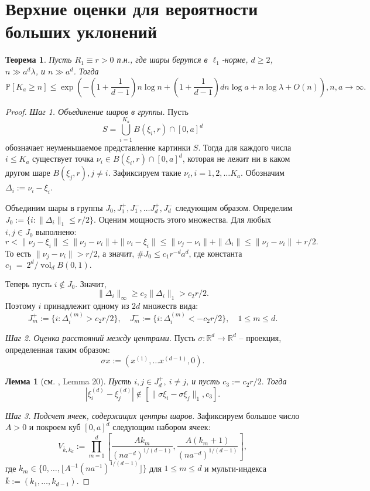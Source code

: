 \documentclass[12pt]{article}
\theoremstyle{plain}
\newtheorem{thm}{Теорема} %
\newtheorem{lm}{Лемма}
\theoremstyle{definition}
\theoremstyle{remark}
\def\geq{\geqslant}
\def\leq{\leqslant}
\DeclareMathOperator{\vol}{vol}
\newcommand{\R}{\mathbb{R}}
\newcommand{\PP}{\mathbb{P}}
\begin{document}
\section{Верхние оценки для вероятности больших уклонений}

\begin{thm}\label{uppconst1}
Пусть $R_1\equiv r > 0$ п.н., где шары берутся в $\ell_1$-норме, $d\geq 2$,  $n \gg a^d\lambda$, и $n\gg a^d$. 
Тогда $$\PP[K_a \geq n] \leq \exp \left(-\left(1+\dfrac{1}{d-1}\right)n\log n + \left(1 + \dfrac{1}{d-1}\right)dn\log a  + n\log\lambda + O(n)\right), n, a\to \infty.$$
\end{thm}{}



\begin{proof}
{\it Шаг 1. Объединение шаров в группы.} Пусть $$S = \bigcup_{i=1}^{K_a} B(\xi_i, r) \cap [0,a]^d$$ обозначает неуменьшаемое представление картинки $S$. Тогда для каждого числа $i\leq K_a$ существует точка $\nu_i\in B(\xi_i, r) \cap [0,a]^d$, которая не лежит ни в каком другом шаре $B(\xi_j, r), j \not= i$. Зафиксируем такие $\nu_i, i = 1, 2, \ldots K_a$. Обозначим $\Delta_i := \nu_i - \xi_i$.

Объединим шары в группы $J_0, J_1^+, J_1^-, \ldots J_d^+, J_d^-$ следующим образом. Определим $J_0 := \{i \colon \|\Delta_i\|_1 \leq r/2\}$. Оценим мощность этого множества. Для любых $i, j \in J_0$ выполнено:
$$r < \|\nu_j - \xi_i\| \leq \|\nu_j - \nu_i\| + \|\nu_i - \xi_i\| \leq 
\|\nu_j - \nu_i\| + \|\Delta_i\| \leq \|\nu_j - \nu_i\| + r/2.$$
То есть $\|\nu_j-\nu_i\|> r/2$, а значит, $\#J_0 \leq  c_1r^{-d}a^d$, где константа $c_1~=~2^d/\vol_d B(0,1).$

Теперь пусть $i\not\in J_0$. Значит, $$\|\Delta_i\|_\infty \geq c_2\|\Delta_i\|_1 > c_2r/2.$$ Поэтому $i$ принадлежит одному из $2d$ множеств вида: $$J_m^+ := \{i\colon \Delta_i^{(m)} > c_2r/2\}, \quad J_m^- := \{i\colon \Delta_i^{(m)} < - c_2r/2\}, \quad 1\leq m\leq d.$$

{\it Шаг 2. Оценка расстояний между центрами.} Пусть $\sigma \colon \R^d \to \R^d$ -- проекция, определенная таким образом: $$\sigma x := (x^{(1)}, \ldots x^{(d-1)}, 0).$$ 

\begin{lm}[см. \cite{AL}, Lemma 20]
Пусть $i, j\in J_d^+, \ i\not= j$, и пусть $c_3 := c_2 r/2.$ Тогда $$|\xi_i^{(d)} - \xi_j^{(d)}| \not\in [\|\sigma\xi_i - \sigma\xi_j\|_1, c_3].$$
\end{lm}{}

{\it Шаг 3. Подсчет ячеек, содержащих центры шаров.} 
Зафиксируем большое число $A > 0$ и покроем куб $[0, a]^d$ следующим набором ячеек: $$V_{\bar k, k_d} := \prod_{m = 1}^d\left[\dfrac{Ak_m}{(na^{-d})^{1/(d-1)}}, \dfrac{A(k_m+1)}{(na^{-d})^{1/(d-1)}}\right],$$
где $k_m\in \{0, \ldots, \lfloor A^{-1}(na^{-1})^{1/(d-1)}\rfloor\}$ для $1\leq m \leq d$ и мульти-индекса $\bar k := (k_1, \ldots, k_{d-1}).$


\end{proof}
\end{document}

